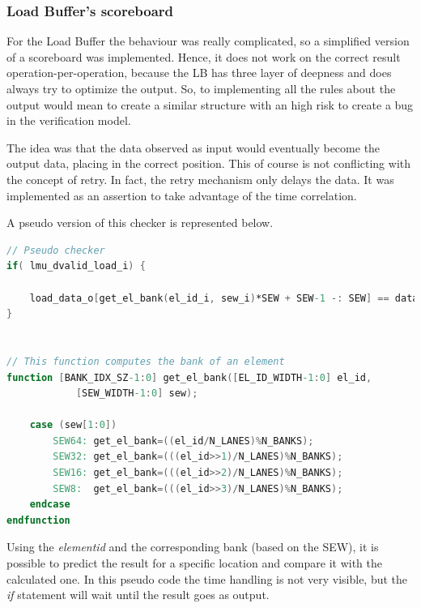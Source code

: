 \subsubsection{Load Buffer's scoreboard}
For the Load Buffer the behaviour was really complicated, so a simplified  version of a scoreboard was implemented.
Hence, it does not work on the correct result operation-per-operation, because the LB has three layer of deepness and does always try to optimize the output. So, to implementing all the rules about the output would mean to create a similar structure with an high risk to create a bug in the verification model.

The idea was that the data observed as input would eventually become the output data, placing in the correct position. This of course is not conflicting with the concept of retry. In fact, the retry mechanism only delays the data.
It was implemented as an assertion to take advantage of the time correlation.

A pseudo version of this checker is represented below.
\bigskip

\linespread{1}

\begin{lstlisting}[language=Verilog,style=verilog-style, backgroundcolor=\color{lyel_palette}, frame=tlb]
// Pseudo checker
if( lmu_dvalid_load_i) { 

    load_data_o[get_el_bank(el_id_i, sew_i)*SEW + SEW-1 -: SEW] == data_i;
}


// This function computes the bank of an element
function [BANK_IDX_SZ-1:0] get_el_bank([EL_ID_WIDTH-1:0] el_id,
            [SEW_WIDTH-1:0] sew);
            
    case (sew[1:0])
        SEW64: get_el_bank=((el_id/N_LANES)%N_BANKS); 
        SEW32: get_el_bank=(((el_id>>1)/N_LANES)%N_BANKS); 
        SEW16: get_el_bank=(((el_id>>2)/N_LANES)%N_BANKS); 
        SEW8:  get_el_bank=(((el_id>>3)/N_LANES)%N_BANKS); 
    endcase
endfunction

\end{lstlisting}

\linespread{1.2}
\bigskip

Using the \emph{element\+id} and the corresponding bank (based on the SEW), it is possible to predict the result for a specific location and compare it with the calculated one. In this pseudo code the time handling is not very visible, but the \emph{if} statement will wait until the result goes as output.


